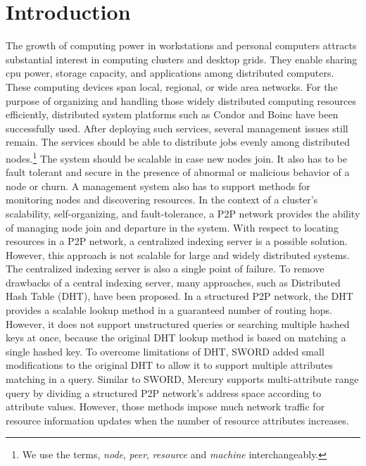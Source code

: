 \documentclass{acm_proc_article-sp}
\begin{document}
\section{Introduction}
The growth of computing power in workstations and personal computers attracts substantial interest in computing clusters and desktop grids\cite{bonic}\cite{condor}. 
They enable sharing cpu power, storage capacity, and applications among distributed computers. 
These computing devices span local, regional, or wide area networks.
For the purpose of organizing and handling those widely distributed computing resources efficiently, distributed system platforms such as Condor\cite{condor} and Boinc\cite{bonic} have been successfully used.
After deploying such services, several management issues still remain. The services should be able to distribute jobs evenly among distributed nodes.\footnote{We use the terms, \textit{node}, \textit{peer}, \textit{resource} and \textit{machine} interchangeably.}
The system should be scalable in case new nodes join. It also has to be fault tolerant and secure in the presence of abnormal or malicious behavior of a node or churn. 
A management system also has to support methods for monitoring nodes and discovering resources.
In the context of a cluster's scalability, self-organizing, and fault-tolerance, a P2P network\cite{chord}\cite{pastry}\cite{can}\cite{bamboo} provides the ability of managing node join and departure in the system. 
With respect to locating resources in a P2P network, a centralized indexing server is a possible solution\cite{bonic}\cite{condor}.
However, this approach is not scalable for large and widely distributed systems. The centralized indexing server is also a single point of failure.
To remove drawbacks of a central indexing server, many approaches, such as  Distributed Hash Table (DHT), have been proposed.
In a structured P2P network, the DHT provides a scalable lookup method in a guaranteed number of routing hops\cite{chord}\cite{pastry}. 
However, it does not support unstructured queries or searching multiple hashed keys at once, because the original DHT lookup method is based on matching a single hashed key.
To overcome limitations of DHT, SWORD\cite{sword} added small modifications to the original DHT to allow it to support multiple attributes matching in a query.
Similar to SWORD, Mercury\cite{mercury} supports multi-attribute range query by dividing a structured P2P network's address space according to attribute values. 
However, those methods impose much network traffic for resource information updates when the number of resource attributes increases. 
\end{document}
